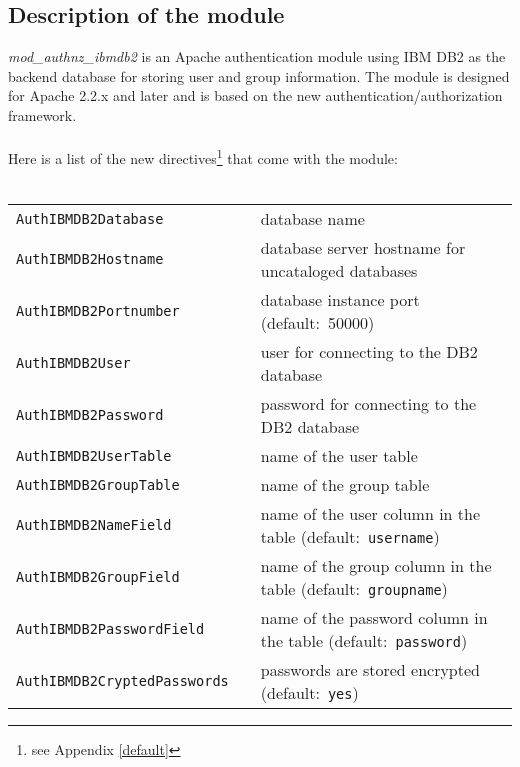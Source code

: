 \documentclass[11pt,letterpaper]{article}
\begin{document}
\subsection{Description of the module}
\emph{mod\_authnz\_ibmdb2} is an Apache authentication module using IBM DB2 as the backend database for storing user and group information. The module is designed for Apache 2.2.x and later and is based on the new authentication/authorization framework.\\
\\
Here is a list of the new directives\footnote{see Appendix \ref{default}} that come with the module:\\
\\
\small
\begin{tabular}{@{} ll >{\raggedright\arraybackslash}p{ 50ex } @{}}
{\tt AuthIBMDB2Database} & & database name \\

{\tt AuthIBMDB2Hostname} & & database server hostname for uncataloged databases \\

{\tt AuthIBMDB2Portnumber} & & database instance port \mbox{(default: 50000)} \\

{\tt AuthIBMDB2User} & & user for connecting to the DB2 database \\

{\tt AuthIBMDB2Password} & & password for connecting to the DB2 database \\

{\tt AuthIBMDB2UserTable} & & name of the user table \\

{\tt AuthIBMDB2GroupTable} & & name of the group table \\

{\tt AuthIBMDB2NameField} & & name of the user column in the table \mbox{(default: {\tt username})} \\

{\tt AuthIBMDB2GroupField} & & name of the group column in the table \mbox{(default: {\tt groupname})} \\

{\tt AuthIBMDB2PasswordField} & & name of the password column in the table \mbox{(default: {\tt password})} \\

{\tt AuthIBMDB2CryptedPasswords} & & passwords are stored encrypted \mbox{(default: {\tt yes})} \\


\end{tabular}
\end{document}
